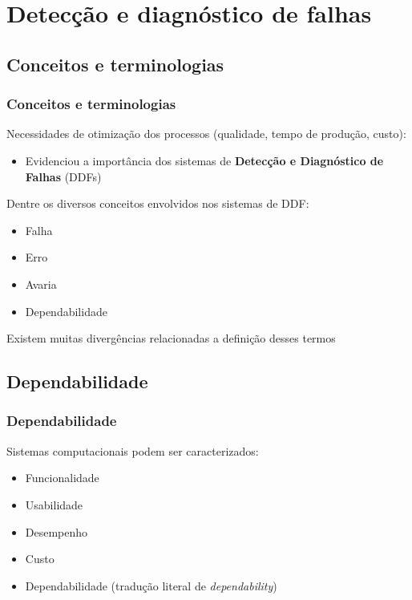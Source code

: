 \documentclass{beamer}
\begin{document}
\section{Detecção e diagnóstico de falhas}
\subsection{Conceitos e terminologias}
\begin{frame}
    \frametitle{Conceitos e terminologias}

    Necessidades de otimização dos processos (qualidade, tempo de produção,
    custo):

\begin{itemize}
    \item Evidenciou a importância dos sistemas de {\bf Detecção e Diagnóstico
          de Falhas} (DDFs)
\end{itemize}

    Dentre os diversos conceitos envolvidos nos sistemas de DDF:

\begin{itemize}
    \item Falha
    \item Erro
    \item Avaria
    \item Dependabilidade
\end{itemize}

    Existem muitas divergências relacionadas a definição desses termos
\end{frame}

\subsection{Dependabilidade}
\begin{frame}
    \frametitle{Dependabilidade}

    Sistemas computacionais podem ser caracterizados:

\begin{itemize}
    \item Funcionalidade
    \item Usabilidade
    \item Desempenho
    \item Custo
    \item \alert{Dependabilidade} (tradução literal de {\it dependability})
\end{itemize}

\end{frame}
\end{document}
